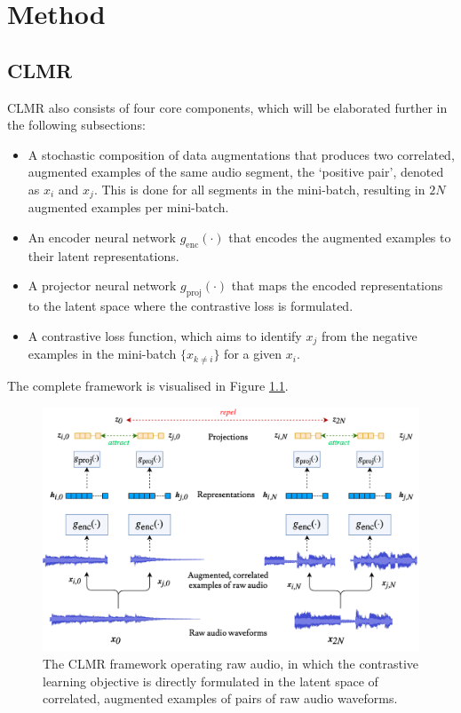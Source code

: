 
\chapter{Method}\label{sec:method}
\section{CLMR}
CLMR also consists of four core components, which will be elaborated further in the following subsections:
\begin{itemize}
    \item A stochastic composition of data augmentations that produces two correlated, augmented examples of the same audio segment, the `positive pair', denoted as $x_i$ and $x_j$. This is done for all segments in the mini-batch, resulting in $2N$ augmented examples per mini-batch.
    \item An encoder neural network $g_{\mathrm{enc}}(\cdot)$ that encodes the augmented examples to their latent representations.
    \item A projector neural network $g_{\mathrm{proj}}(\cdot)$ that maps the encoded representations to the latent space where the contrastive loss is formulated.
    \item A contrastive loss function, which aims to identify $x_j$ from the negative examples in the mini-batch $\{x_{k\neq i}\}$ for a given $x_i$.
\end{itemize}

The complete framework is visualised in Figure \ref{fig:clmr_model}.

\begin{fullwidth}
    \begin{figure}[h]
        \includegraphics[width=\columnwidth]{figs/clmr_model.png}
        \caption{The CLMR framework operating raw audio, in which the contrastive learning objective is directly formulated in the latent space of correlated, augmented examples of pairs of raw audio waveforms.}
        \label{fig:clmr_model}
    \end{figure}
\end{fullwidth}


